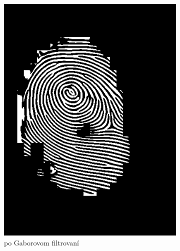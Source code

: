 \begin{figure}[h]
\begin{subfigure}[b]{0.3\linewidth}
      \includegraphics[width=\linewidth]{obrazky-figures/warts_gabor.png}
      \caption{po Gaborovom filtrovaní}
    \end{subfigure}
    \hfill
    \begin{subfigure}[b]{0.3\linewidth}

\end{subfigure}
\end{figure}
